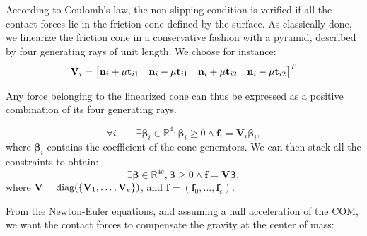 According to Coulomb's law, the non slipping condition is verified if all the contact forces lie in the friction cone defined by the surface.
As classically done, we linearize the friction cone in a conservative fashion with a pyramid, described by four generating rays of unit length. We choose for instance:
\begin{equation*}
\mathbf{V}_{i} = \begin{bmatrix}\mathbf{n}_{i} + \mu \mathbf{t}_{i1} & \mathbf{n}_{i} -\mu \mathbf{t}_{i1} & \mathbf{n}_{i} + \mu \mathbf{t}_{i2} & \mathbf{n}_{i} - \mu \mathbf{t}_{i2}\end{bmatrix}^T
\end{equation*}

Any force belonging to the linearized cone
can thus be expressed as a positive combination of its four generating rays.

\begin{equation*}
\forall i  \qquad  \exists \bm{\beta}_i \in \mathbb{R}^{4} : \bm{\beta}_i \ge 0 \wedge \mathbf{f}_{i} = \mathbf{V}_{i} \bm{\beta}_i,
\end{equation*}
where $\bm{\beta}_i$ contains the coefficient of the cone generators.
We can then stack all the constraints to obtain:
\begin{equation}\label{eq:gen}
\exists \bm{\beta} \in \mathbb{R}^{4e} ,  \bm{\beta} \ge 0 \wedge \mathbf{f} = \mathbf{V} \bm{\beta},
\end{equation}
where $\mathbf{V} = \text{diag}( \{\mathbf{V}_1, \dots, \mathbf{V}_e\} )$, and $\mathbf{f} = (\mathbf{f}_0,...,\mathbf{f}_e)$.

From the Newton-Euler equations, and assuming a null acceleration of the COM, we want the contact forces to compensate the gravity at the center of mass:



